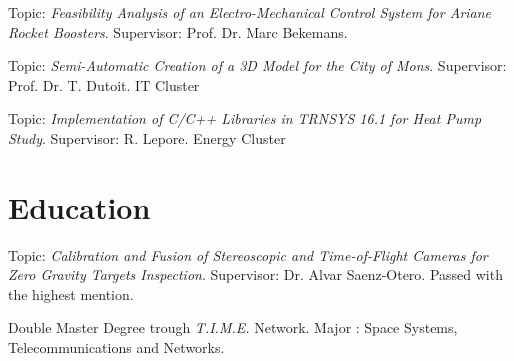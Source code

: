 \documentclass[a4paper]{deedy-resume} %
\begin{document}

Topic: \textit{Feasibility Analysis of an Electro-Mechanical Control System for Ariane Rocket Boosters}. Supervisor: Prof. Dr. Marc Bekemans.

\vspace{10pt}

Topic: \textit{Semi-Automatic Creation of a 3D Model for the City of Mons}. Supervisor: Prof. Dr. T. Dutoit. IT Cluster

\vspace{10pt}

Topic: \textit{Implementation of C/C++ Libraries in TRNSYS 16.1 for Heat Pump Study}. Supervisor: R. Lepore. Energy Cluster

\vspace{15pt}


\section{Education}
\vspace{5pt}

\vspace{2pt}
Topic: \textit{Calibration and Fusion of Stereoscopic and Time-of-Flight Cameras for Zero Gravity Targets Inspection}. Supervisor: Dr. Alvar Saenz-Otero. Passed with the highest mention.

\vspace{10pt}

\vspace{2pt}
Double Master Degree trough \textit{T.I.M.E.} Network. Major : Space Systems, Telecommunications and Networks.
\end{document}
